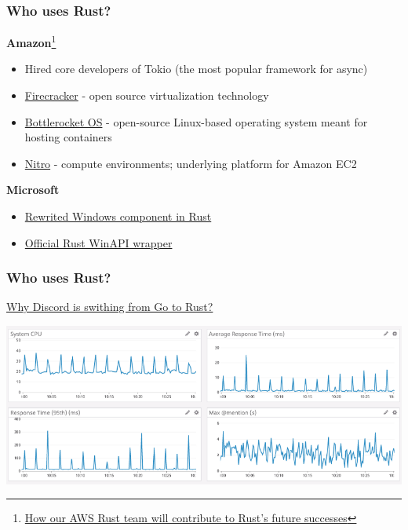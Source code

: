 \documentclass[aspectratio=1610,t]{beamer}
\begin{document}

\begin{frame}
\frametitle{Who uses Rust?}
\textbf{Amazon}\footnote{\href{https://aws.amazon.com/blogs/opensource/how-our-aws-rust-team-will-contribute-to-rusts-future-successes/}{How our AWS Rust team will contribute to Rust’s future successes}}

\begin{itemize}
    \item Hired core developers of Tokio (the most popular framework for async)
    \item \href{https://github.com/firecracker-microvm/firecracker}{Firecracker} - open source virtualization technology
    \item \href{https://github.com/bottlerocket-os/bottlerocket}{Bottlerocket OS} - open-source Linux-based operating system meant for hosting containers
    \item \href{https://aws.amazon.com/ec2/nitro/}{Nitro} - compute environments; underlying platform for Amazon EC2
\end{itemize}

\textbf{Microsoft}

\begin{itemize}
    \item \href{https://msrc-blog.microsoft.com/2019/11/07/using-rust-in-windows/}{Rewrited Windows component in Rust}
    \item \href{https://github.com/microsoft/windows-rs}{Official Rust WinAPI wrapper}
\end{itemize}
\end{frame}


\begin{frame}
\frametitle{Who uses Rust?}
\href{https://discord.com/blog/why-discord-is-switching-from-go-to-rust}{Why Discord is swithing from Go to Rust?}

\includegraphics[width=\textwidth,height=\textheight,keepaspectratio]{images/discord-spikes.png}

\end{frame}
\end{document}
